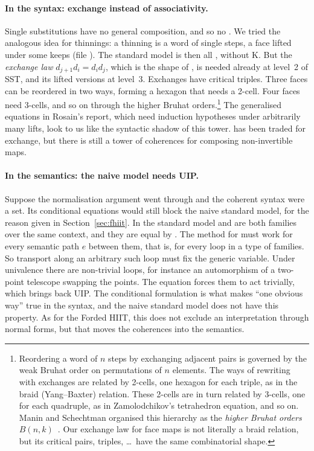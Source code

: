 \documentclass[11pt]{article}
\newcommand{\ag}[1]{\texttt{\detokenize{#1}}}
\newcommand{\repourl}{https://github.com/txa/sst-new}
\newcommand{\agfile}[1]{\href{\repourl/blob/main/#1}{\ag{#1}}}
\begin{document}
\paragraph{In the syntax: exchange instead of associativity.}
Single substitutions have no general composition, and so no \ag{ass}. We tried
the analogous idea for thinnings: a thinning is a word of single steps, a
face \ag{p} lifted under some keeps (file
\agfile{experiments/ssc/SSC.agda}). The
standard model is then all \ag{refl}, without K. But the
\emph{exchange law} $d_{j+1}d_i = d_id_j$, which is the shape of
\ag{A[p][γ⁺] = A[γ][p]}, is needed already at level~2 of SST, and its lifted
versions at level~3. Exchanges have critical triples. Three faces can be
reordered in two ways, forming a hexagon that needs a 2-cell. Four faces need
3-cells, and so on through the higher Bruhat orders.\footnote{Reordering
a word of $n$ steps by exchanging adjacent pairs is governed by the weak
Bruhat order on permutations of $n$ elements. The ways of rewriting with
exchanges are related by 2-cells, one hexagon for each triple, as in the
braid (Yang--Baxter) relation. These 2-cells are in turn related by 3-cells,
one for each quadruple, as in Zamolodchikov's tetrahedron equation, and so on.
Manin and Schechtman organised this hierarchy as the \emph{higher Bruhat
orders} $B(n,k)$~\cite{manin-schechtman}. Our exchange law for face maps is
not literally a braid relation, but its critical pairs, triples, \dots\ have
the same combinatorial shape.} The generalised
equations in Rosain's report, which need induction hypotheses under
arbitrarily many lifts, look to us like the syntactic shadow of this tower.
\ag{ass} has been traded for exchange, but there is still a tower of
coherences for composing non-invertible maps.

\paragraph{In the semantics: the naive model needs UIP.}
Suppose the normalisation argument went through and the coherent syntax were
a set. Its conditional equations would still block the naive standard model,
for the reason given in Section~\ref{sec:fhiit}. In the standard model
\ag{A[p][γ⁺]} and \ag{A[γ][p]} are both families over the same context, and
they are equal by \ag{refl}. The method for \ag{vz[γ⁺] =e vz} must work for
every semantic path $e$ between them, that is, for every loop in a type of
families. So transport along an arbitrary such loop must fix the generic
variable. Under univalence there are non-trivial loops, for instance an
automorphism of a two-point telescope swapping the points. The equation forces
them to act trivially, which brings back UIP. The conditional formulation is
what makes ``one obvious way'' true in the syntax, and the naive standard
model does not have this property. As for the Forded HIIT, this does not
exclude an interpretation through normal forms, but that moves the
coherences into the semantics.
\end{document}
